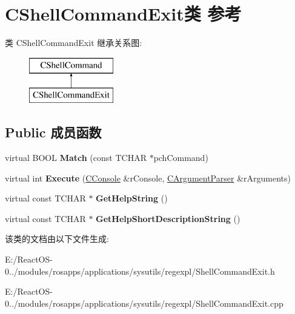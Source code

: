\hypertarget{class_c_shell_command_exit}{}\section{C\+Shell\+Command\+Exit类 参考}
\label{class_c_shell_command_exit}
类 C\+Shell\+Command\+Exit 继承关系图\+:\begin{figure}[H]
\begin{center}
\leavevmode
\includegraphics[height=2.000000cm]{class_c_shell_command_exit}
\end{center}
\end{figure}
\subsection*{Public 成员函数}
\begin{DoxyCompactItemize}
\item 
\mbox{\label{class_c_shell_command_exit_ab958c0ef8528869263a7dfeaf6c4a3fb}} 
virtual B\+O\+OL {\bfseries Match} (const T\+C\+H\+AR $\ast$pch\+Command)
\item 
\mbox{\label{class_c_shell_command_exit_a1c8179b579494fd6430025953ca7a063}} 
virtual int {\bfseries Execute} (\hyperlink{class_c_console}{C\+Console} \&r\+Console, \hyperlink{class_c_argument_parser}{C\+Argument\+Parser} \&r\+Arguments)
\item 
\mbox{\label{class_c_shell_command_exit_ab3802b60ead6a4f742bc7510e8d90c53}} 
virtual const T\+C\+H\+AR $\ast$ {\bfseries Get\+Help\+String} ()
\item 
\mbox{\label{class_c_shell_command_exit_a208ce0aa771bfc349653a9a12c7ee558}} 
virtual const T\+C\+H\+AR $\ast$ {\bfseries Get\+Help\+Short\+Description\+String} ()
\end{DoxyCompactItemize}


该类的文档由以下文件生成\+:\begin{DoxyCompactItemize}
\item 
E\+:/\+React\+O\+S-\/0../modules/rosapps/applications/sysutils/regexpl/Shell\+Command\+Exit.\+h\item 
E\+:/\+React\+O\+S-\/0../modules/rosapps/applications/sysutils/regexpl/Shell\+Command\+Exit.\+cpp\end{DoxyCompactItemize}
